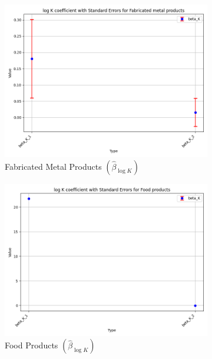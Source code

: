 \documentclass{article}
\begin{document}
\begin{figure}[ht!]
    \begin{subfigure}[t]{0.32\textwidth}
        \centering
        \includegraphics[width=\textwidth]{figure/empirical_ar1_mixture_kmshare_ciiu_beta_logK_with_error_bars_Fabricated metal products.png}
        \caption{Fabricated Metal Products $(\hat{\beta}_{\log K})$}
    \end{subfigure}
    \begin{subfigure}[t]{0.32\textwidth}
        \centering
        \includegraphics[width=\textwidth]{figure/empirical_ar1_mixture_kmshare_ciiu_beta_logK_with_error_bars_Food products.png}
        \caption{Food Products $(\hat{\beta}_{\log K})$}
    \end{subfigure}
    \begin{subfigure}[t]{0.32\textwidth}

\end{subfigure}
\end{figure}
\end{document}
